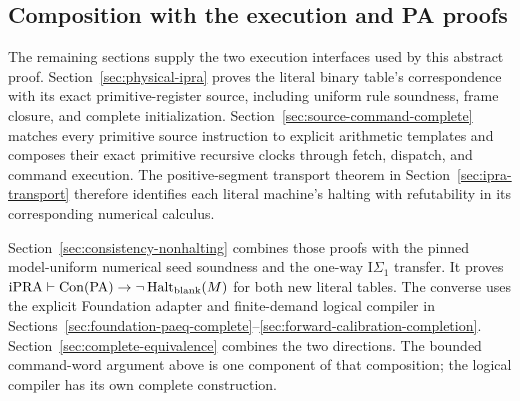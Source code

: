 \subsection{Composition with the execution and PA proofs}

The remaining sections supply the two execution interfaces used by this
abstract proof. Section~\ref{sec:physical-ipra} proves the literal binary
table's correspondence with its exact primitive-register source, including
uniform rule soundness, frame closure, and complete initialization.
Section~\ref{sec:source-command-complete} matches every primitive source
instruction to explicit arithmetic templates and composes their exact
primitive recursive clocks through fetch, dispatch, and command execution.
The positive-segment transport theorem in
Section~\ref{sec:ipra-transport} therefore identifies each literal machine's
halting with refutability in its corresponding numerical calculus.

Section~\ref{sec:consistency-nonhalting} combines those proofs with the
pinned model-uniform numerical seed soundness and the one-way
$\mathrm I\Sigma_1$ transfer. It proves
$\mathrm{iPRA}\vdash\operatorname{Con}(\mathrm{PA})\to\neg\operatorname{Halt}_{\rm blank}(M)$ for both
new literal tables. The converse uses the explicit Foundation adapter
and finite-demand logical compiler in
Sections~\ref{sec:foundation-paeq-complete}--\ref{sec:forward-calibration-completion}.
Section~\ref{sec:complete-equivalence} combines the two directions.
The bounded command-word argument above is one component of that
composition; the logical compiler has its own complete construction.
